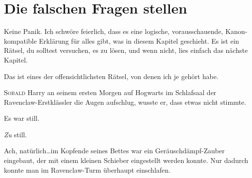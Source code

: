 \chapter{Die falschen Fragen stellen}

\begin{chapterOpeningAuthorNote}
%
Keine Panik. Ich schwöre feierlich, dass es eine logische, vorausschauende, Kanon-kompatible Erklärung für alles gibt, was in diesem Kapitel geschieht. Es ist ein Rätsel, du solltest versuchen, es zu lösen, und wenn nicht, lies einfach das nächste Kapitel.
\end{chapterOpeningAuthorNote}
\begin{chapterOpeningQuote}
Das ist eines der offensichtlichsten Rätsel, von denen ich je gehört habe.
\end{chapterOpeningQuote}



\lettrine{S}{obald} Harry an seinem ersten Morgen auf Hogwarts im Schlafsaal der Ravenclaw-Erstklässler die Augen aufschlug, wusste er, dass etwas nicht stimmte.

Es war still.

\emph{Zu} still.

Ach, natürlich…im Kopfende seines Bettes war ein Geräuschdämpf-Zauber eingebaut, der mit einem kleinen Schieber eingestellt werden konnte. Nur dadurch konnte man im Ravenclaw-Turm überhaupt einschlafen.

